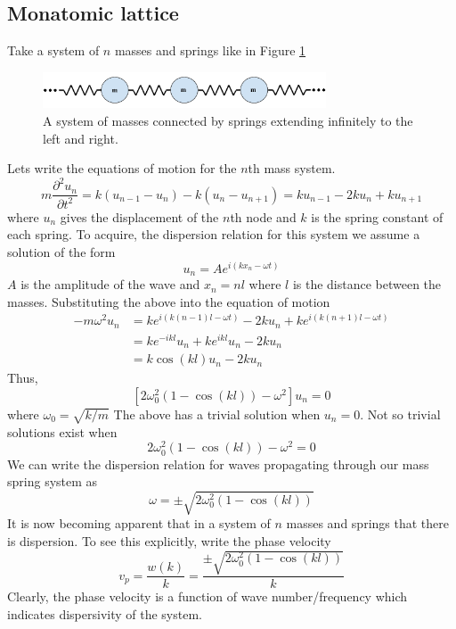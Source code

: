\documentclass{article}
\begin{document}
\subsection{Monatomic lattice} \label{monatomic}
Take a system of $n$ masses and springs like in Figure \ref{fig:ms} 
\begin{figure}[!htbp]
	\centering
	\includegraphics[width=0.75\textwidth]{mass-spring.pdf}
	\caption{A system of masses connected by springs extending infinitely to 
	the left and right.}
	\label{fig:ms}
\end{figure}
Lets write the equations of motion for the $n$th mass system.
\begin{equation} \label{eqnms}
m\frac{\partial^2 u_n}{\partial t^2} = k(u_{n-1} - u_n) - k(u_n - u_{n+1}) = 
ku_{n-1} - 2ku_n + ku_{n+1} 
\end{equation}
where $u_n$ gives the displacement of the $n$th node and $k$ is the spring 
constant of each spring. To acquire, the dispersion relation for this system we 
assume a solution of the form
\begin{equation} \label{bloch}
u_n = Ae^{i(kx_n-\omega t)}
\end{equation}
$A$ is the amplitude of the wave and $x_n = nl$ where $l$ is the distance 
between the masses. Substituting the above into the equation of motion
\begin{align*}
-m \omega^2 u_n   &= ke^{i(k(n-1)l - \omega t)} - 2ku_n + ke^{i(k(n+1)l - 
\omega t)} \\
&= ke^{-ikl}u_n + ke^{ikl}u_n - 2ku_n \\
&= k\cos(kl)u_n - 2ku_n
\end{align*}
Thus,
\begin{equation}
\left[2\omega_0^2(1 - \cos(kl)) - \omega^2\right]u_n = 0
\end{equation}
where $\omega_0 = \sqrt{k/m}$ The above has a trivial solution when $u_n = 0$. 
Not so trivial solutions exist when
\begin{equation}
2\omega_0^2(1 - \cos(kl)) - \omega^2= 0
\end{equation}
We can write the dispersion relation for waves propagating through our mass 
spring system as
\begin{equation} \label{monatomicdisp}
\omega = \pm \sqrt{2\omega_0^2(1 - \cos(kl))}
\end{equation}
It is now becoming apparent that in a system of $n$ masses and springs that 
there is dispersion. To see this explicitly, write the phase velocity
\begin{equation}
v_p = \frac{w(k)}{k} = \frac{\pm\sqrt{2\omega_0^2(1 - \cos(kl))}}{k}
\end{equation}
Clearly, the phase velocity is a function of wave number/frequency which 
indicates dispersivity of the system.
\end{document}
